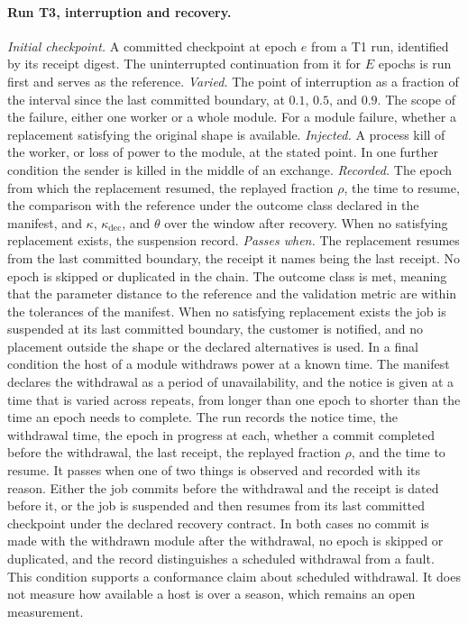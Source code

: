 \documentclass[11pt,openany]{book}
\theoremstyle{remark}
\begin{document}
\paragraph{Run T3, interruption and recovery.} \emph{Initial checkpoint.} A committed checkpoint at epoch $e$ from a T1 run, identified by its receipt digest. The uninterrupted continuation from it for $E$ epochs is run first and serves as the reference. \emph{Varied.} The point of interruption as a fraction of the interval since the last committed boundary, at $0.1$, $0.5$, and $0.9$. The scope of the failure, either one worker or a whole module. For a module failure, whether a replacement satisfying the original shape is available. \emph{Injected.} A process kill of the worker, or loss of power to the module, at the stated point. In one further condition the sender is killed in the middle of an exchange. \emph{Recorded.} The epoch from which the replacement resumed, the replayed fraction $\rho$, the time to resume, the comparison with the reference under the outcome class declared in the manifest, and $\kappa$, $\kappa_{\mathrm{dec}}$, and $\theta$ over the window after recovery. When no satisfying replacement exists, the suspension record. \emph{Passes when.} The replacement resumes from the last committed boundary, the receipt it names being the last receipt. No epoch is skipped or duplicated in the chain. The outcome class is met, meaning that the parameter distance to the reference and the validation metric are within the tolerances of the manifest. When no satisfying replacement exists the job is suspended at its last committed boundary, the customer is notified, and no placement outside the shape or the declared alternatives is used. In a final condition the host of a module withdraws power at a known time. The manifest declares the withdrawal as a period of unavailability, and the notice is given at a time that is varied across repeats, from longer than one epoch to shorter than the time an epoch needs to complete. The run records the notice time, the withdrawal time, the epoch in progress at each, whether a commit completed before the withdrawal, the last receipt, the replayed fraction $\rho$, and the time to resume. It passes when one of two things is observed and recorded with its reason. Either the job commits before the withdrawal and the receipt is dated before it, or the job is suspended and then resumes from its last committed checkpoint under the declared recovery contract. In both cases no commit is made with the withdrawn module after the withdrawal, no epoch is skipped or duplicated, and the record distinguishes a scheduled withdrawal from a fault. This condition supports a conformance claim about scheduled withdrawal. It does not measure how available a host is over a season, which remains an open measurement.
\end{document}
